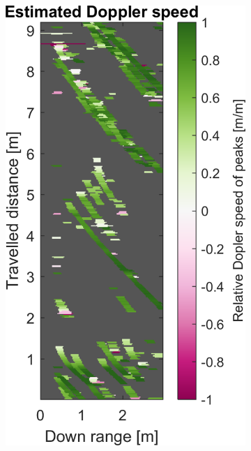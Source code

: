 \begin{figure}[htbp]
\begin{subfigure}[t]{0.475\linewidth}
        \includegraphics[width=\linewidth,max height=.475\textheight]{gfx/results/mancave_doppler.png}
    \end{subfigure}\bigskip\\
    \begin{subfigure}[t]{0.475\linewidth}
        \centering

\end{subfigure}
\end{figure}
